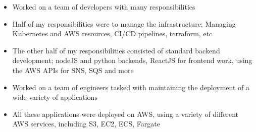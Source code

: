 \documentclass[10pt,a4paper,ragged2e]{assets/altacv}
\begin{document}


\begin{fullwidth}
\makecvheader
\end{fullwidth}



\begin{itemize}
  \item Worked on a team of developers with many responsibilities
  \item Half of my responsibilities were to manage the infrastructure; Managing Kubernetes and AWS resources, CI/CD pipelines, terraform, etc
  \item The other half of my responsibilities consisted of standard backend development; nodeJS and python backends, ReactJS for frontend work, using the AWS APIs for SNS, SQS and more
\end{itemize}

\divider

\begin{itemize}
\item Worked on a team of engineers tasked with maintaining the deployment of a wide variety of applications
\item All these applications were deployed on AWS, using a variety of different AWS services, including S3, EC2, ECS, Fargate
\end{itemize}
\end{document}
